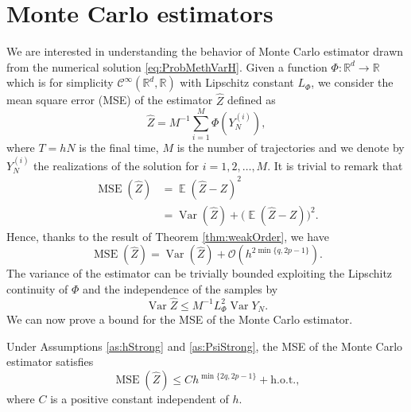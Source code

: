 \documentclass{siamart1116}
\numberwithin{theorem}{section}
\newcommand{\R}{\mathbb{R}}
\newcommand{\OO}{\mathcal{O}}
\newcommand{\Var}{\operatorname{Var}}
\newcommand{\E}{\operatorname{\mathbb{E}}}
\newcommand{\MSE}{\operatorname{MSE}}
\newcommand{\sksum}{\textstyle\sum}
\begin{document}
\section{Monte Carlo estimators}
We are interested in understanding the behavior of Monte Carlo estimator drawn from the numerical solution \eqref{eq:ProbMethVarH}. Given a function $\Phi\colon\R^d\to\R$ which is for simplicity $\mathcal{C}^\infty(\R^d, \R)$ with Lipschitz constant $L_\Phi$, we consider the mean square error (MSE) of the estimator $\hat Z$ defined as
\begin{equation}\label{eq:MSE}
	\hat Z = M^{-1} \sksum_{i = 1}^M \Phi(Y_N^{(i)}),
\end{equation}
where $T = hN$ is the final time, $M$ is the number of trajectories and we denote by $Y_N^{(i)}$ the realizations of the solution for $i = 1, 2, \ldots, M$. It is trivial to remark that 
\begin{equation}
\begin{aligned}
	\MSE(\hat Z) &= \E(\hat Z - Z)^2\\
	&= \Var(\hat Z) + \big(\E(\hat Z - Z)\big)^2.
\end{aligned}
\end{equation}
Hence, thanks to the result of Theorem \ref{thm:weakOrder}, we have
\begin{equation}\label{eq:MSEDecomposition}
	\MSE(\hat Z) = \Var(\hat Z) + \OO(h^{2\min\{q, 2p - 1\}}).
\end{equation}
The variance of the estimator can be trivially bounded exploiting the Lipschitz continuity of $\Phi$ and the independence of the samples by
\begin{equation}\label{eq:MSELipschitz}
	\Var\hat Z \leq M^{-1} L_\Phi^2 \Var Y_N.
\end{equation}
We can now prove a bound for the MSE of the Monte Carlo estimator.
\begin{theorem}\label{thm:MSEMonteCarlo} Under Assumptions \ref{as:hStrong} and \ref{as:PsiStrong}, the MSE of the Monte Carlo estimator satisfies
	\begin{equation}
		\MSE(\hat Z) \leq C h^{\min\{2q, 2p -1\}} + \mathrm{h.o.t.},
	\end{equation}
	where $C$ is a positive constant independent of $h$.
\end{theorem}
\end{document}
